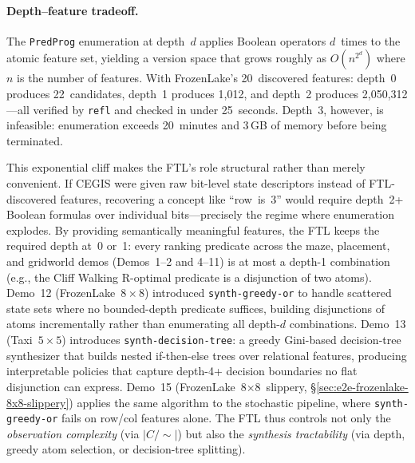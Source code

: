 \documentclass[9pt,a4paper]{article}
\theoremstyle{plain}
\theoremstyle{definition}
\theoremstyle{remark}
\begin{document}
\paragraph{Depth--feature tradeoff.}
The \texttt{PredProg} enumeration at depth~$d$ applies Boolean operators $d$~times to the atomic feature set, yielding a version space that grows roughly as $O(n^{2^d})$ where $n$ is the number of features.  With FrozenLake's 20~discovered features: depth~0 produces 22~candidates, depth~1 produces 1{,}012, and depth~2 produces 2{,}050{,}312---all verified by \texttt{refl} and checked in under 25~seconds.  Depth~3, however, is infeasible: enumeration exceeds 20~minutes and 3\,GB of memory before being terminated.

This exponential cliff makes the FTL's role structural rather than merely convenient.  If CEGIS were given raw bit-level state descriptors instead of FTL-discovered features, recovering a concept like ``row~is~3'' would require depth~2+ Boolean formulas over individual bits---precisely the regime where enumeration explodes.  By providing semantically meaningful features, the FTL keeps the required depth at~0 or~1: every ranking predicate across the maze, placement, and gridworld demos (Demos~1--2 and 4--11) is at most a depth-1 combination (e.g., the Cliff Walking R-optimal predicate is a disjunction of two atoms).  Demo~12 (FrozenLake~$8{\times}8$) introduced \texttt{synth-greedy-or} to handle scattered state sets where no bounded-depth predicate suffices, building disjunctions of atoms incrementally rather than enumerating all depth-$d$ combinations.  Demo~13 (Taxi~$5{\times}5$) introduces \texttt{synth-decision-tree}: a greedy Gini-based decision-tree synthesizer that builds nested if-then-else trees over relational features, producing interpretable policies that capture depth-4+ decision boundaries no flat disjunction can express.  Demo~15 (FrozenLake~8×8~slippery, \S\ref{sec:e2e-frozenlake-8x8-slippery}) applies the same algorithm to the stochastic pipeline, where \texttt{synth-greedy-or} fails on row/col features alone.  The FTL thus controls not only the \emph{observation complexity} (via $|C/{\sim}|$) but also the \emph{synthesis tractability} (via depth, greedy atom selection, or decision-tree splitting).
\end{document}
